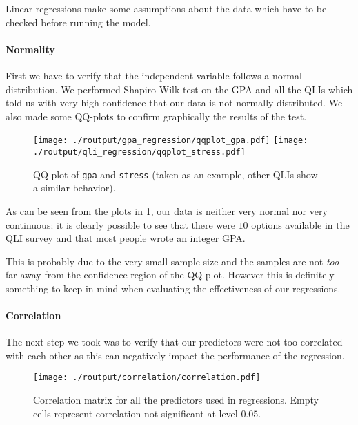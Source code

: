 \documentclass[11pt]{extarticle}
\numberwithin{table}{section}
\numberwithin{figure}{section}
\numberwithin{equation}{section}
\begin{document}
Linear regressions make some assumptions about the data which have to be checked before
running the model.

\paragraph{Normality}
First we have to verify that the independent variable follows a normal distribution.
We performed Shapiro-Wilk test on the GPA and all the QLIs which told us
with very high confidence that our data is not normally distributed.
We also made some QQ-plots to confirm graphically the results of the test.

\begin{figure}[!ht]
	\centering
	{\texttt{[image: ./routput/gpa\_regression/qqplot\_gpa.pdf]}}
	\hspace{1cm}
	{\texttt{[image: ./routput/qli\_regression/qqplot\_stress.pdf]}}
	\caption{QQ-plot of \texttt{gpa} and \texttt{stress}
		(taken as an example, other QLIs show a similar behavior).
	}
	\label{fig:qq-gpa-stress}
\end{figure}

As can be seen from the plots in \cref{fig:qq-gpa-stress},
our data is neither very normal nor very continuous:
it is clearly possible to see that there were $10$ options available in the QLI survey
and that most people wrote an integer GPA.

This is probably due to the very small sample size
and the samples are not \textit{too} far away from the confidence region of the QQ-plot.
However this is definitely something to keep in mind when
evaluating the effectiveness of our regressions.

\paragraph{Correlation}
The next step we took was to verify that our predictors
were not too correlated with each other as this can negatively impact the performance
of the regression.

\begin{figure}[!ht]
	\centering
	\texttt{[image: ./routput/correlation/correlation.pdf]}
	\caption{
		Correlation matrix for all the predictors used in regressions.
		Empty cells represent correlation not significant at level $0.05$.
	}
	\label{fig:corr}
\end{figure}
\end{document}
